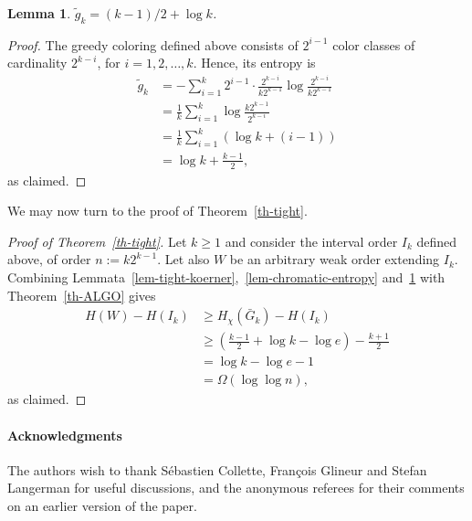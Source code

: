 \documentclass[12pt,oneside]{article}
\newtheorem{lemma}{Lemma}
\begin{document}
\begin{lemma}
\label{lem-tight-greedy}
$\tilde  g_{k} = (k-1)/2 + \log k$.
\end{lemma}
\begin{proof}
The greedy coloring defined above
consists of $2^{i-1}$ color classes of cardinality $2^{k-i}$, for $i=1,2,\dots, k$.
Hence, its entropy is
\begin{align*}
\tilde  g_{k} &= - \sum_{i=1}^{k} 2^{i-1} \cdot \frac{2^{k-i}}{k2^{k-1}} \log \frac{2^{k-i}}{k2^{k-1}}\\
&= \frac{1}{k} \sum_{i=1}^{k} \log \frac{k2^{k-1}}{2^{k-i}} \\
&= \frac{1}{k} \sum_{i=1}^{k} (\log k + (i-1))\\
&= \log k + \frac{k-1}{2},
\end{align*}
as claimed.
\end{proof}

We may now turn to the proof of Theorem~\ref{th-tight}.

\begin{proof}[Proof of Theorem~\ref{th-tight}]
Let $k\geq 1$ and consider the interval order $I_{k}$ defined above, of
order $n:=k2^{k-1}$.
Let also $W$ be an arbitrary weak order extending $I_{k}$.
Combining Lemmata~\ref{lem-tight-koerner},~\ref{lem-chromatic-entropy}
and~\ref{lem-tight-greedy} with Theorem~\ref{th-ALGO} gives
\begin{align*}
H(W) - H(I_{k})
&\geq H_{\chi}(\bar G_{k}) - H(I_{k})  \\
&\geq \left(\frac{k-1}{2} + \log k - \log e \right) - \frac{k+1}{2}\\
&= \log k - \log e - 1 \\\
&= \Omega(\log \log n),
\end{align*}
as claimed.
\end{proof}

\paragraph{Acknowledgments}
The authors wish to thank S\'ebastien Collette, Fran\c{c}ois Glineur and Stefan Langerman for useful discussions, and the anonymous referees for their comments on an earlier version of the paper.


\end{document}
